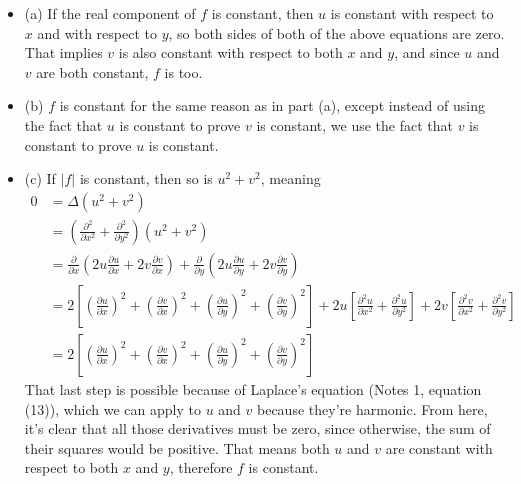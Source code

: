 \documentclass[12pt]{article}
\begin{document}
\begin{itemize}
    \item (a) If the real component of $f$ is constant, then $u$ is constant with respect to $x$ and with respect to $y$, so both sides of both of the above equations are zero. That implies $v$ is also constant with respect to both $x$ and $y$, and since $u$ and $v$ are both constant, $f$ is too.
    \item (b) $f$ is constant for the same reason as in part (a), except instead of using the fact that $u$ is constant to prove $v$ is constant, we use the fact that $v$ is constant to prove $u$ is constant.
    \item (c) If $|f|$ is constant, then so is $u^2+v^2$, meaning
        \begin{align*}
            0 &= \Delta (u^2+v^2) \\
              &= \left( \frac{\partial^2}{\partial x^2} + \frac{\partial^2}{\partial y^2} \right) (u^2+v^2) \\
              &= \frac{\partial}{\partial x} \left( 2u \frac{\partial u}{\partial x} + 2v \frac{\partial v}{\partial x} \right) + \frac{\partial}{\partial y} \left( 2u \frac{\partial u}{\partial y} + 2v \frac{\partial v}{\partial y} \right) \\
              &= 2 \left[ \left( \frac{\partial u}{\partial x} \right)^2 + \left( \frac{\partial v}{\partial x} \right)^2 + \left( \frac{\partial u}{\partial y} \right)^2 + \left( \frac{\partial v}{\partial y} \right)^2 \right] + 2u \left[ \frac{\partial^2 u}{\partial x^2} + \frac{\partial^2 u}{\partial y^2} \right] + 2v \left[ \frac{\partial^2 v}{\partial x^2} + \frac{\partial^2 v}{\partial y^2} \right]\\
              &= 2 \left[ \left( \frac{\partial u}{\partial x} \right)^2 + \left( \frac{\partial v}{\partial x} \right)^2 + \left( \frac{\partial u}{\partial y} \right)^2 + \left( \frac{\partial v}{\partial y} \right)^2 \right]
        \end{align*}
        That last step is possible because of Laplace's equation (Notes 1, equation (13)), which we can apply to $u$ and $v$ because they're harmonic. From here, it's clear that all those derivatives must be zero, since otherwise, the sum of their squares would be positive. That means both $u$ and $v$ are constant with respect to both $x$ and $y$, therefore $f$ is constant.
\end{itemize}

\noindent{}\bigskip
\end{document}
